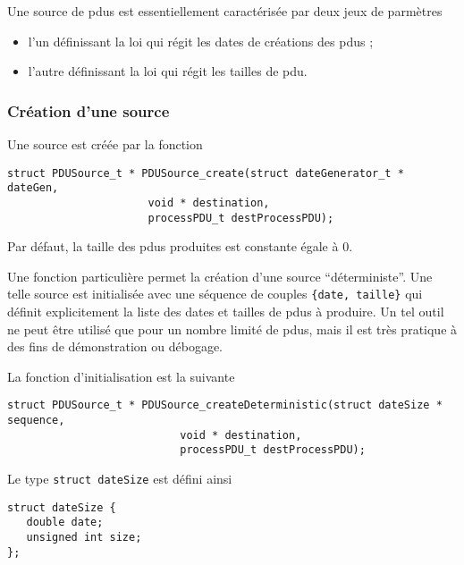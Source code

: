 \documentclass{article}
\begin{document}
   Une source de {\sc pdu}s est essentiellement caractérisée par deux
jeux de parmètres

\begin{itemize}
   \item l'un définissant la loi qui régit les dates de créations
     des {\sc pdu}s ;
   \item l'autre définissant la loi qui régit les tailles de {\sc
     pdu}.
\end{itemize}

%
\subsubsection{Création d'une source}

   Une source est créée par la fonction 

\begin{verbatim}
struct PDUSource_t * PDUSource_create(struct dateGenerator_t * dateGen,
				      void * destination,
				      processPDU_t destProcessPDU);
\end{verbatim}

   Par défaut, la taille des {\sc pdu}s produites est constante égale
à 0.

   Une fonction particulière permet la création d'une source
``déterministe''. Une telle source est initialisée avec une séquence
de couples {\tt \{date, taille\}} qui définit explicitement la liste
des dates et tailles de {\sc pdu}s à produire. Un tel outil ne peut
être utilisé que pour un nombre limité de {\sc pdu}s, mais il est très
pratique à des fins de démonstration ou débogage.

   La fonction d'initialisation est la suivante

\begin{verbatim}
struct PDUSource_t * PDUSource_createDeterministic(struct dateSize * sequence,
						   void * destination,
						   processPDU_t destProcessPDU);
\end{verbatim}

   Le type {\tt struct dateSize} est défini ainsi

\begin{verbatim}
struct dateSize {
   double date;
   unsigned int size;
};
\end{verbatim}
\end{document}
